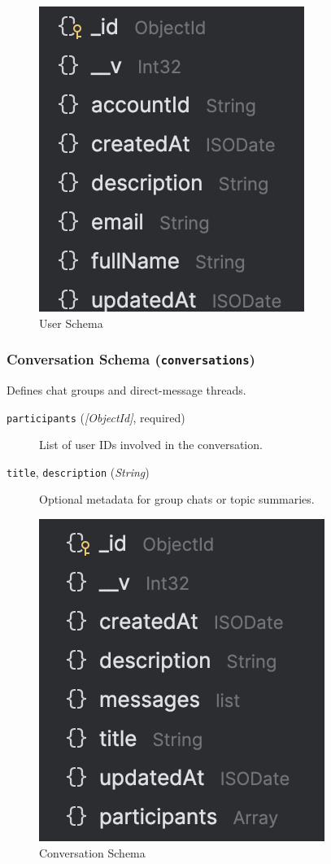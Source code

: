 \begin{figure}[H]
  \centering
  \includegraphics{profile-schema.png}
  \caption*{User Schema}
  \label{fig:profile-schema}
\end{figure}

\subsubsection{Conversation Schema (\texttt{conversations})}
Defines chat groups and direct-message threads.
\begin{description}
  \item[\texttt{participants} (\emph{[ObjectId]}, required)]  
    List of user IDs involved in the conversation.
  \item[\texttt{title}, \texttt{description} (\emph{String})]  
    Optional metadata for group chats or topic summaries.
\end{description}

\begin{figure}[H]
  \centering
  \includegraphics{conversation-schema.png}
  \caption*{Conversation Schema}
  \label{fig:conversation-schema}
\end{figure}

